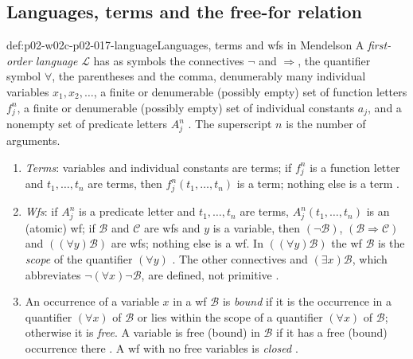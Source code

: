 \subsection{Languages, terms and the free-for relation}
\label{sec:p02-w02c-p02-017-language}

\begin{hbdefinition}{def:p02-w02c-p02-017-language}{Languages, terms and wfs in Mendelson}
A \emph{first-order language} \(\mathscr L\) has as symbols the connectives
\(\neg\) and \(\Rightarrow\), the quantifier symbol \(\forall\), the
parentheses and the comma, denumerably many individual variables
\(x_1,x_2,\ldots\), a finite or denumerable (possibly empty) set of function
letters \(f^n_j\), a finite or denumerable (possibly empty) set of individual
constants \(a_j\), and a nonempty set of predicate letters \(A^n_j\)
\cite[\S 2.2, p.~57]{Mendelson1997}.  The superscript \(n\) is the number of
arguments.
\begin{enumerate}
  \item \emph{Terms}: variables and individual constants are terms; if
        \(f^n_j\) is a function letter and \(t_1,\ldots,t_n\) are terms, then
        \(f^n_j(t_1,\ldots,t_n)\) is a term; nothing else is a term
        \cite[\S 2.1, p.~52]{Mendelson1997}.
  \item \emph{Wfs}: if \(A^n_j\) is a predicate letter and
        \(t_1,\ldots,t_n\) are terms, \(A^n_j(t_1,\ldots,t_n)\) is an
        (atomic) wf; if \(\mathscr B\) and \(\mathscr C\) are wfs and \(y\) is
        a variable, then \((\neg\mathscr B)\), \((\mathscr B\Rightarrow
        \mathscr C)\) and \(((\forall y)\mathscr B)\) are wfs; nothing else is
        a wf.  In \(((\forall y)\mathscr B)\) the wf \(\mathscr B\) is the
        \emph{scope} of the quantifier \((\forall y)\)
        \cite[\S 2.1, p.~52]{Mendelson1997}.  The other connectives and
        \((\exists x)\mathscr B\), which abbreviates
        \(\neg(\forall x)\neg\mathscr B\), are defined, not primitive
        \cite[\S 2.1, p.~52]{Mendelson1997}.
  \item An occurrence of a variable \(x\) in a wf \(\mathscr B\) is
        \emph{bound} if it is the occurrence in a quantifier
        \((\forall x)\) of \(\mathscr B\) or lies within the scope of a
        quantifier \((\forall x)\) of \(\mathscr B\); otherwise it is
        \emph{free}.  A variable is free (bound) in \(\mathscr B\) if it has a
        free (bound) occurrence there \cite[\S 2.1, p.~53]{Mendelson1997}.
        A wf with no free variables is \emph{closed}
        \cite[\S 2.2, p.~58]{Mendelson1997}.

\end{enumerate}
\end{hbdefinition}
